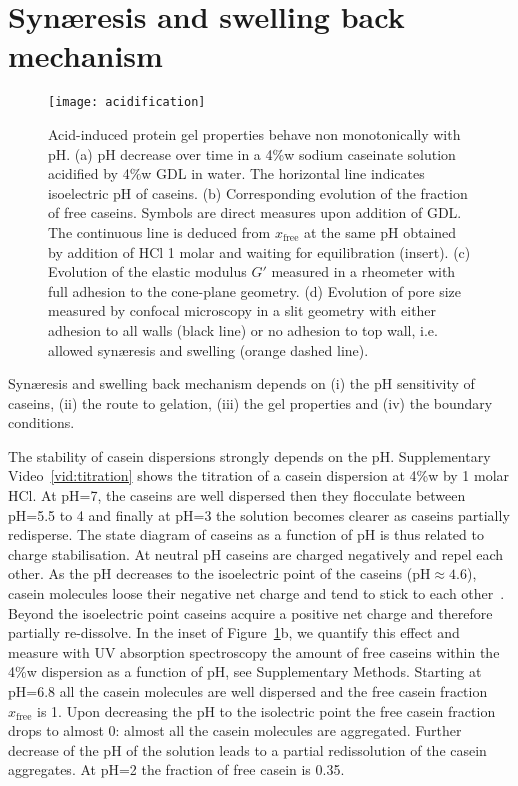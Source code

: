 \documentclass[twocolumn,superscriptaddress,showpacs,preprintnumbers,
amsmath,amssymb,prl]{revtex4-1}
\begin{document}
\section*{Syn\ae{}resis and swelling back mechanism}

\begin{figure}
	\texttt{[image: acidification]}%
	\caption{Acid-induced protein gel properties behave non monotonically with pH. (a) pH decrease over time in a 4\%w sodium caseinate solution acidified by 4\%w GDL in water. The horizontal line indicates isoelectric pH of caseins. (b) Corresponding evolution of the fraction of free caseins. Symbols are direct measures upon addition of GDL. The continuous line is deduced from $x_\text{free}$ at the same pH obtained by addition of HCl 1 molar and waiting for equilibration (insert). (c) Evolution of the elastic modulus $G'$ measured in a rheometer with full adhesion to the cone-plane geometry. (d) Evolution of pore size measured by confocal microscopy in a slit geometry with either adhesion to all walls (black line) or no adhesion to top wall, i.e. allowed syn\ae{}resis and swelling (orange dashed line).}%
	\label{fig:acidification}
\end{figure}


Syn\ae{}resis and swelling back mechanism depends on (i) the pH sensitivity of caseins, (ii) the route to gelation, (iii) the gel properties and (iv) the boundary conditions.

The stability of casein dispersions strongly depends on the pH. Supplementary Video~\ref{vid:titration} shows the titration of a casein dispersion at 4\%w by 1 molar HCl. At pH=7, the caseins are well dispersed then they flocculate between pH=5.5 to 4 and finally at pH=3 the solution becomes clearer as caseins partially redisperse. The state diagram of caseins as a function of pH is thus related to charge stabilisation. At neutral pH caseins are charged negatively and repel each other. As the pH decreases to the isoelectric point of the caseins (pH$\approx 4.6$), casein molecules loose their negative net charge and tend to stick to each other~\cite{Roefs1986,Bremer1989,Lucey1998,Dickinson2002}. Beyond the isoelectric point caseins acquire a positive net charge and therefore partially re-dissolve. In the inset of Figure~\ref{fig:acidification}b, we quantify this effect and measure with UV absorption spectroscopy the amount of free caseins within the 4\%w dispersion as a function of pH, see Supplementary Methods. Starting at pH=6.8 all the casein molecules are well dispersed and the free casein fraction $x_\text{free}$ is 1. Upon decreasing the pH to the isolectric point the free casein fraction drops to almost 0: almost all the casein molecules are aggregated. Further decrease of the pH of the solution leads to a partial redissolution of the casein aggregates. At pH=2 the fraction of free casein is 0.35.
\end{document}
